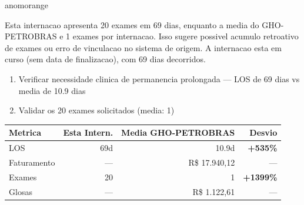 \documentclass[a4paper,10pt]{article}
\begin{document}
\begin{anomalycard}[Internacao 161824 | GHO-PETROBRAS | ALTO (z=4.96)]{anomorange}
\vspace{2pt}\begin{tcolorbox}[colback=severityred!20,colframe=anomorange,title={\textbf{Interpretacao de Negocio}},fonttitle=\bfseries\small,left=4pt,right=4pt,top=3pt,bottom=3pt]
{\small Esta internacao apresenta 20 exames em 69 dias, enquanto a media do GHO-PETROBRAS e 1 exames por internacao. Isso sugere possivel acumulo retroativo de exames ou erro de vinculacao no sistema de origem. A internacao esta em curso (sem data de finalizacao), com 69 dias decorridos.}
\end{tcolorbox}
\begin{tcolorbox}[colback=severityyellow!30,colframe=anomorange,title={\textbf{Recomendacoes Especificas}},fonttitle=\bfseries\small,left=4pt,right=4pt,top=3pt,bottom=3pt]
\begin{enumerate}[nosep,leftmargin=16pt]
\item {\small Verificar necessidade clinica de permanencia prolongada --- LOS de 69 dias vs media de 10.9 dias}
\item {\small Validar os 20 exames solicitados (media: 1)}
\end{enumerate}
\end{tcolorbox}
\begin{center}\begin{tabular}{l r r r}\toprule\textbf{Metrica} & \textbf{Esta Intern.} & \textbf{Media GHO-PETROBRAS} & \textbf{Desvio} \\\midrule
LOS & 69d & 10.9d & \textcolor{anomred}{\textbf{+535\%}} \\
Faturamento & --- & R\$ 17.940,12 & --- \\
Exames & 20 & 1 & \textcolor{anomred}{\textbf{+1399\%}} \\
Glosas & --- & R\$ 1.122,61 & --- \\
\bottomrule\end{tabular}\end{center}


\end{anomalycard}
\end{document}
